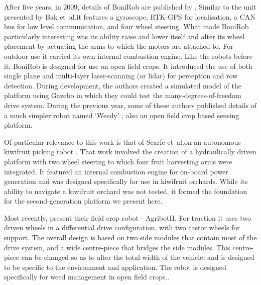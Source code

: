 \documentclass[preprint,authoryear,12pt]{elsarticle}
\begin{document}
        After five years, in 2009, details of BoniRob are published by \cite{Ruckelshausen2009}.
        Similar to the unit presented by Bak et~al.\@ it features a gyroscope, RTK-GPS for localisation, a CAN bus for low level communication, and four wheel steering.
        What made BoniRob particularly interesting was its ability raise and lower itself and alter its wheel placement by actuating the arms to which the motors are attached to.
        For outdoor use it carried its own internal combustion engine.
        Like the robots before it, BoniRob is designed for use on open field crops.
        It introduced the use of both single plane and multi-layer laser-scanning (or lidar) for perception and row detection.
        During development, the authors created a simulated model of the platform using Gazebo in which they could test the many-degrees-of-freedom drive system.
        During the previous year, some of these authors published details of a much simpler robot named `Weedy' \citep{Klose2008}, also an open field crop based sensing platform.

        Of particular relevance to this work is that of Scarfe et~al.\@ on an autonomous kiwifruit picking robot \citep{scarfe2009, Scarfe2012}.
        That work involved the creation of a hydraulically driven platform with two wheel steering to which four fruit harvesting arms were integrated.
        It featured an internal combustion engine for on-board power generation and was designed specifically for use in kiwifruit orchards.
        While its ability to navigate a kiwifruit orchard was not tested, it formed the foundation for the second-generation platform we present here.

        Most recently, \cite{Bawden2017} present their field crop robot - AgribotII.
        For traction it uses two driven wheels in a differential drive configuration, with two castor wheels for support.
        The overall design is based on two side modules that contain most of the drive system, and a wide centre-piece that bridges the side modules.
        This centre-piece can be changed so as to alter the total width of the vehicle, and is designed to be specific to the environment and application.
        The robot is designed specifically for weed management in open field crops..
\end{document}
